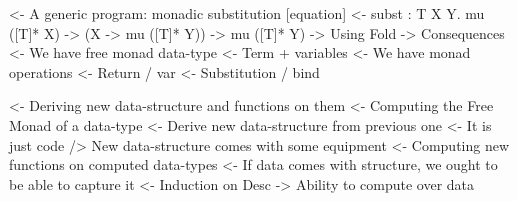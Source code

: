 \begin{structure}
<- A generic program: monadic substitution [equation]
    <- subst : \forall T X Y. mu ([T]* X) -> (X -> mu ([T]* Y)) -> mu ([T]* Y)
        -> Using Fold
    -> Consequences
        <- We have free monad data-type
            <- Term + variables
        <- We have monad operations
            <- Return / var
            <- Substitution / bind
\end{structure}

\begin{structure}
<- Deriving new data-structure and functions on them
    <- Computing the Free Monad of a data-type
        <- Derive new data-structure from previous one
            <- It is just code
        /> New data-structure comes with some equipment
    <- Computing new functions on computed data-types
        <- If data comes with structure, we ought to be able to capture it
            <- Induction on Desc
            -> Ability to compute over data
\end{structure}
